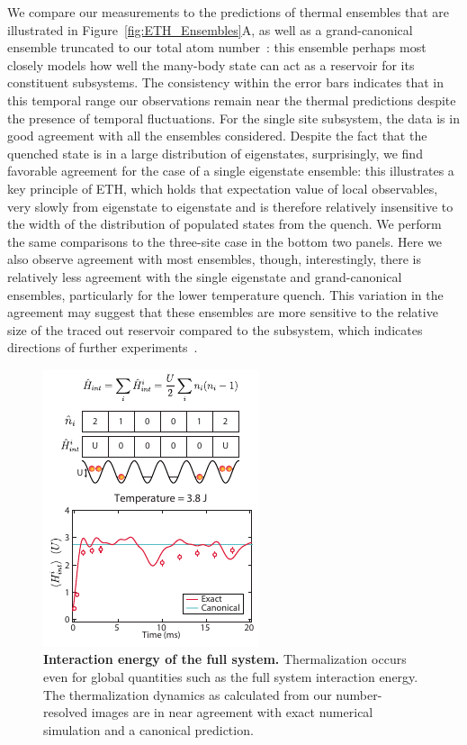 We compare our measurements to the predictions of thermal ensembles that are illustrated in Figure~\ref{fig:ETH_Ensembles}A, as well as a grand-canonical ensemble truncated to our total atom number~\cite{AppendixA}: this ensemble perhaps most closely models how well the many-body state can act as a reservoir for its constituent subsystems. The consistency within the error bars indicates that in this temporal range our observations remain near the thermal predictions despite the presence of temporal fluctuations. For the single site subsystem, the data is in good agreement with all the ensembles considered. Despite the fact that the quenched state is in a large distribution of eigenstates, surprisingly, we find favorable agreement for the case of a single eigenstate ensemble: this illustrates a key principle of ETH, which holds that expectation value of local observables, very slowly from eigenstate to eigenstate and is therefore relatively insensitive to the width of the distribution of populated states from the quench. We perform the same comparisons to the three-site case in the bottom two panels. Here we also observe agreement with most ensembles, though, interestingly, there is relatively less agreement with the single eigenstate and grand-canonical ensembles, particularly for the lower temperature quench. This variation in the agreement may suggest that these ensembles are more sensitive to the relative size of the traced out reservoir compared to the subsystem, which indicates directions of further experiments~\cite{Rigol2012}.

\begin{figure}[t!]
	\centering
	\includegraphics[scale=1.75]{figures/ETH_Eint.pdf}
	\caption{{\bf Interaction energy of the full system. } Thermalization occurs even for global quantities such as the full system interaction energy. The thermalization dynamics as calculated from our number-resolved images are in near agreement with exact numerical simulation and a canonical prediction.}
	\label{fig:ETH_Eint}
\end{figure}

